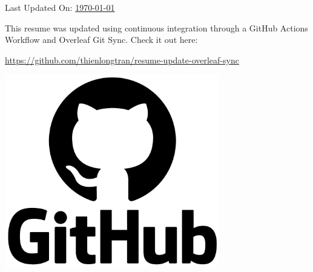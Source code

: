 \documentclass[letterpaper,11pt]{article}
\begin{document}
\vspace*{\fill}

\begin{minipage}{0.6\textwidth}

Last Updated On: \underline{\today}\newline

This resume was updated using continuous integration through a GitHub Actions Workflow and Overleaf Git Sync. Check it out here:

\href{https://github.com/thienlongtran/resume-update-overleaf-sync}{https://github.com/thienlongtran/resume-update-overleaf-sync}
\end{minipage}
\hfill%
\begin{minipage}{0.3\textwidth}\raggedleft
\includegraphics[width=0.7\textwidth]{gha-logo.png}
\end{minipage}
\vspace*{\fill}

\end{document}
